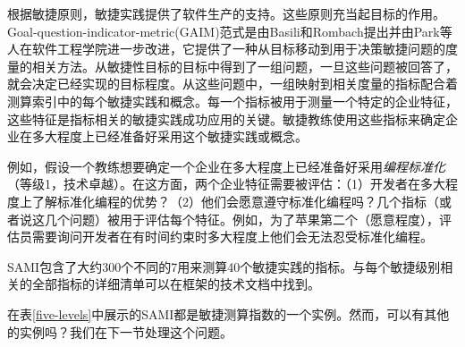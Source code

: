 \documentclass[twocolumn]{svjour3}[]
\begin{document}
根据敏捷原则，敏捷实践提供了软件生产的支持。这些原则充当起目标的作用。Goal-question-indicator-metric(GAIM)范式是由Basili和Rombach提出\cite{basili1992software}并由Park等人\cite{park1996goal}在软件工程学院进一步改进，它提供了一种从目标移动到用于决策敏捷问题的度量的相关方法。从敏捷性目标的目标中得到了一组问题，一旦这些问题被回答了，就会决定已经实现的目标程度。从这些问题中，一组映射到相关度量的指标配合着测算索引中的每个敏捷实践和概念。每一个指标被用于测量一个特定的企业特征，这些特征是指标相关的敏捷实践成功应用的关键。敏捷教练使用这些指标来确定企业在多大程度上已经准备好采用这个敏捷实践或概念。

例如，假设一个教练想要确定一个企业在多大程度上已经准备好采用\textit{编程标准化}（等级1，技术卓越）。在这方面，两个企业特征需要被评估：（1）开发者在多大程度上了解标准化编程的优势？（2）他们会愿意遵守标准化编程吗？几个指标（或者说这几个问题）被用于评估每个特征。例如，为了苹果第二个（愿意程度），评估员需要询问开发者在有时间约束时多大程度上他们会无法忍受标准化编程。

SAMI包含了大约300个不同的7用来测算40个敏捷实践的指标。与每个敏捷级别相关的全部指标的详细清单可以在框架的技术文档中找到\cite{sidky2006agile}。

在表\ref{five-levels}中展示的SAMI都是敏捷测算指数的一个实例。然而，可以有其他的实例吗？我们在下一节处理这个问题。



\end{document}
